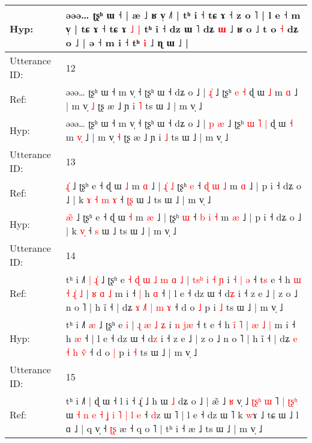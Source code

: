 \documentclass[10pt]{article}
\DeclareRobustCommand{\hl}[1]{{\textcolor{red}{#1}}}
\begin{document}
\begin{longtable}{ll}
 \\
Hyp: & əəə… ʈʂʰ ɯ ˧ | æ\hl{} ˩ ʁ v̩ ˩˥ | tʰ i ˧ tɕ ɤ ˧ z o ˥ | l e ˧ m v̩\hl{}\hl{} | tɕ ɤ ˧ tɕ ɤ\hl{ }\hl{˩} \hl{|} tʰ i ˧ dz ɯ ˥\hl{}\hl{}\hl{}\hl{}\hl{} dʑ \hl{ɯ} ˩ ʁ o ˩ t o \hl{˧} dʑ o ˩ | ə ˧ m i ˧ tʰ\hl{}\hl{}\hl{}\hl{}\hl{} \hl{}\hl{i} ˩ ɳ ɯ ˩ |
 \\
\midrule
Utterance ID: & 12 \\
Ref: & əəə… ʈʂʰ ɯ ˧ m v̩ ˧ ʈʂʰ ɯ ˧ dʑ o ˩ | \hl{}\hl{ɻ}\hl{̍} ˩ ʈʂʰ\hl{}\hl{} \hl{e} \hl{˧} ɖ ɯ \hl{˩} m \hl{}\hl{ɑ} ˩ | m v̩ \hl{˩} ʈʂ æ ˩ ɲ i \hl{˥} ts ɯ ˩ | m v̩ ˩
 \\
Hyp: & əəə… ʈʂʰ ɯ ˧ m v̩ ˧ ʈʂʰ ɯ ˧ dʑ o ˩ | \hl{p}\hl{ }\hl{æ} ˩ ʈʂʰ\hl{ }\hl{ɯ} \hl{˥} \hl{|} ɖ ɯ \hl{˧} m \hl{v}\hl{̩} ˩ | m v̩ \hl{˧} ʈʂ æ ˩ ɲ i \hl{˩} ts ɯ ˩ | m v̩ ˩
 \\
\midrule
Utterance ID: & 13 \\
Ref: & \hl{ɻ}\hl{̍} ˩ ʈʂʰ e ˧ ɖ ɯ \hl{˩} m \hl{ɑ} ˩ |\hl{ }\hl{ɻ}\hl{̍}\hl{ }\hl{˩} ʈʂʰ \hl{e} ˧ \hl{ɖ} \hl{ɯ} \hl{˩} m \hl{ɑ} ˩ | p i ˧ dʑ o ˩ | k\hl{ }\hl{ɤ}\hl{ }\hl{˧} \hl{m}\hl{ }\hl{ɤ} ˧ \hl{ʈ}\hl{ʂ} ɯ ˩ ts ɯ ˩ | m v̩ ˩
 \\
Hyp: & \hl{æ}\hl{̃} ˩ ʈʂʰ e ˧ ɖ ɯ \hl{˧} m \hl{æ} ˩ |\hl{}\hl{}\hl{}\hl{}\hl{} ʈʂʰ \hl{ɯ} ˧ \hl{b} \hl{i} \hl{˧} m \hl{æ} ˩ | p i ˧ dʑ o ˩ | k\hl{}\hl{}\hl{}\hl{} \hl{}\hl{v}\hl{̩} ˧ \hl{}\hl{s} ɯ ˩ ts ɯ ˩ | m v̩ ˩
 \\
\midrule
Utterance ID: & 14 \\
Ref: & tʰ i ˩˥\hl{ }\hl{|} \hl{ɻ}\hl{̍} ˩ ʈʂʰ e\hl{ }\hl{˧}\hl{ }\hl{ɖ}\hl{ }\hl{ɯ}\hl{ }\hl{˩}\hl{ }\hl{m}\hl{ }\hl{ɑ} \hl{˩} | \hl{t}\hl{s}\hl{ʰ} \hl{i} \hl{˧} \hl{ɲ} i \hl{˧} \hl{|}\hl{ }\hl{ə} ˧ t\hl{s} e ˧ h\hl{ }\hl{ɯ}\hl{ }\hl{˧} \hl{ɻ}\hl{̍} \hl{˩} | \hl{ʁ} \hl{ɑ} \hl{˩} m i ˧\hl{ }\hl{|} h \hl{ɑ} ˧ | l e ˧ dz ɯ ˧ d\hl{ʑ} i ˧ z e ˩ | z o ˩ n o ˥ | h ĩ ˧ | dʑ \hl{ɤ} \hl{˩}\hl{˥} \hl{|} \hl{m}\hl{ }\hl{ɤ} ˧ d o \hl{˩} p i \hl{˩} ts ɯ ˩ | m v̩ ˩
 \\
Hyp: & tʰ i ˩˥\hl{}\hl{} \hl{}\hl{æ} ˩ ʈʂʰ e\hl{}\hl{}\hl{}\hl{}\hl{}\hl{}\hl{}\hl{}\hl{}\hl{}\hl{}\hl{} \hl{i} | \hl{}\hl{}\hl{ɻ} \hl{æ} \hl{˩} \hl{ʑ} i \hl{n} \hl{}\hl{j}\hl{æ} ˧ t\hl{} e ˧ h\hl{}\hl{}\hl{}\hl{} \hl{i}\hl{̃} \hl{˥} | \hl{æ} \hl{˩} \hl{|} m i ˧\hl{}\hl{} h \hl{æ} ˧ | l e ˧ dz ɯ ˧ d\hl{z} i ˧ z e ˩ | z o ˩ n o ˥ | h ĩ ˧ | dʑ \hl{e} \hl{}\hl{˧} \hl{h} \hl{}\hl{v}\hl{̃} ˧ d o \hl{|} p i \hl{˧} ts ɯ ˩ | m v̩ ˩
 \\
\midrule
Utterance ID: & 15 \\
Ref: & tʰ i ˩˥ | ɖ ɯ ˧ l i ˧ ɻ̍ ˩ h ɯ \hl{˩} dʑ o ˩ | æ̃ ˩ \hl{ʁ} v̩ ˩ \hl{ʈ}\hl{ʂ}\hl{ʰ} \hl{ɯ} ˥\hl{ }\hl{|}\hl{ }\hl{ʈ}\hl{ʂ}\hl{ʰ} ɯ\hl{ }\hl{˧}\hl{ }\hl{n}\hl{ }\hl{e}\hl{ }\hl{˧}\hl{ }\hl{ʝ} \hl{i} \hl{˥} \hl{|}\hl{ }\hl{l} \hl{e} ˧ \hl{d}z ɯ ˥ | l e ˧ dz ɯ ˥ k \hl{w}ɤ ˩ tɕ ɯ ˩ l ɑ ˩ | q v̩ ˧ \hl{ʈ}\hl{ʂ} æ ˧ q o ˥ | tʰ i ˧ æ ˩ ts ɯ ˩ | m v̩ ˩

\end{longtable}
\end{document}
